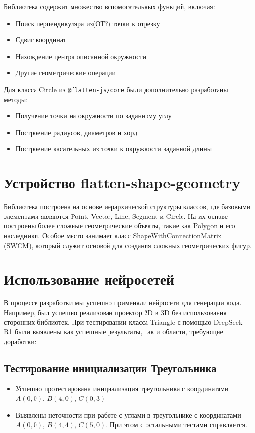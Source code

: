 \documentclass[a4paper, 12pt]{extarticle}
\begin{document}
Библиотека содержит множество вспомогательных функций, включая:
\begin{itemize}
    \item Поиск перпендикуляра из(ОТ?) точки к отрезку
    \item Сдвиг координат
    \item Нахождение центра описанной окружности
    \item Другие геометрические операции
\end{itemize}

Для класса Circle из \texttt{@flatten-js/core} были дополнительно разработаны методы:
\begin{itemize}
    \item Получение точки на окружности по заданному углу
    \item Построение радиусов, диаметров и хорд
    \item Построение касательных из точки к окружности заданной длины
\end{itemize}

\section{Устройство flatten-shape-geometry}

Библиотека построена на основе иерархической структуры классов, где базовыми элементами являются Point, Vector, Line, Segment и Circle. На их основе построены более сложные геометрические объекты, такие как Polygon и его наследники. Особое место занимает класс ShapeWithConnectionMatrix (SWCM), который служит основой для создания сложных геометрических фигур.

\section{Использование нейросетей}

В процессе разработки мы успешно применяли нейросети для генерации кода. Например, был успешно реализован проектор 2D в 3D без использования сторонних библиотек. При тестировании класса Triangle с помощью DeepSeek R1 были выявлены как успешные результаты, так и области, требующие доработки:
\subsection*{Тестирование инициализации Треугольника}
\begin{itemize}
    \item Успешно протестирована инициализация треугольника с координатами $A(0,0)$, $B(4,0)$, $C(0,3)$
    \item Выявлены неточности при работе с углами в треугольнике с координатами $A(0,0)$, $B(4,4)$, $C(5,0)$. При этом с остальными тестами справляется.
\end{itemize}
\end{document}

